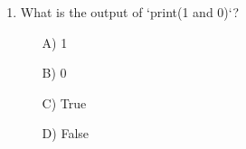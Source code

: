 \documentclass[9pt]{article}
\begin{document}
\begin{multicols}{2}
\begin{enumerate}
\item What is the output of `print(1 and 0)`?
\begin{enumerate}
\item[A)] 1
\item[B)] 0
\item[C)] True
\item[D)] False
\end{enumerate}

\end{enumerate}

\end{multicols}
\end{document}
